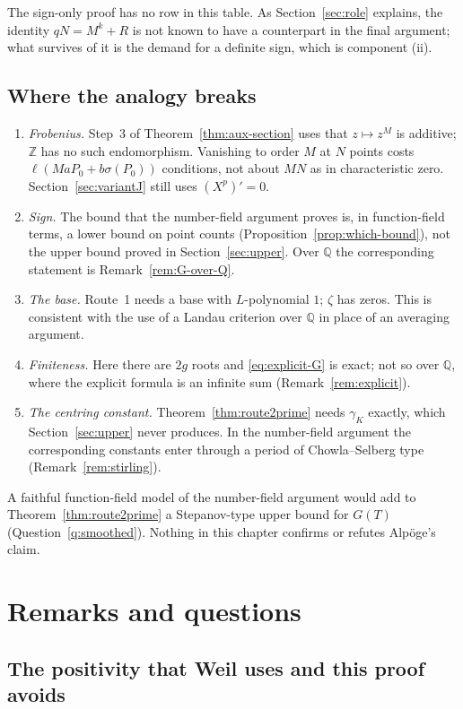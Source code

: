 \documentclass[11pt]{amsbook}
\theoremstyle{plain}
\theoremstyle{definition}
\theoremstyle{remark}
\numberwithin{equation}{section}
\numberwithin{figure}{chapter}
\numberwithin{table}{chapter}
\newcommand{\Q}{\mathbb{Q}}
\newcommand{\Z}{\mathbb{Z}}
\begin{document}
The sign-only proof has no row in this table. As
Section~\ref{sec:role} explains, the identity $qN=M^k+R$ is not
known to have a counterpart in the final argument; what survives
of it is the demand for a definite sign, which is component (ii).

\subsection{Where the analogy breaks}
\begin{enumerate}[label=(B\arabic*)]
\item \emph{Frobenius.} Step~3 of
Theorem~\ref{thm:aux-section} uses that $z\mapsto z^M$ is
additive; $\Z$ has no such endomorphism. Vanishing to order $M$ at
$N$ points costs $\ell(MaP_0+b\sigma(P_0))$ conditions, not about
$MN$ as in characteristic zero. Section~\ref{sec:variantJ} still
uses $(X^p)'=0$.
\item \emph{Sign.} The bound that the number-field argument proves
is, in function-field terms, a lower bound on point counts
(Proposition~\ref{prop:which-bound}), not the upper bound proved
in Section~\ref{sec:upper}. Over $\Q$ the corresponding statement
is Remark~\ref{rem:G-over-Q}.
\item \emph{The base.} Route~1 needs a base with $L$-polynomial
$1$; $\zeta$ has zeros. This is consistent with the use of a
Landau criterion over $\Q$ in place of an averaging argument.
\item \emph{Finiteness.} Here there are $2g$ roots and
\eqref{eq:explicit-G} is exact; not so over $\Q$, where the
explicit formula is an infinite sum (Remark~\ref{rem:explicit}).
\item \emph{The centring constant.}
Theorem~\ref{thm:route2prime} needs $\gamma_K$ exactly, which
Section~\ref{sec:upper} never produces. In the number-field
argument the corresponding constants enter through a period of
Chowla--Selberg type (Remark~\ref{rem:stirling}).
\end{enumerate}
A faithful function-field model of the number-field argument would
add to Theorem~\ref{thm:route2prime} a Stepanov-type upper bound
for $G(T)$ (Question~\ref{q:smoothed}). Nothing in this chapter
confirms or refutes Alp\"oge's claim.

\section{Remarks and questions}
\label{sec:remarks}

\subsection{The positivity that Weil uses and this proof avoids}
\end{document}
